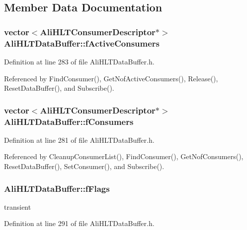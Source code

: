 \subsection{Member Data Documentation}
\subsubsection{\setlength{\rightskip}{0pt plus 5cm}vector$<${\bf Ali\-HLTConsumer\-Descriptor}$\ast$$>$ {\bf Ali\-HLTData\-Buffer::f\-Active\-Consumers}\hspace{0.3cm}{\tt  [private]}}\label{classAliHLTDataBuffer_r2}




Definition at line 283 of file Ali\-HLTData\-Buffer.h.

Referenced by Find\-Consumer(), Get\-Nof\-Active\-Consumers(), Release(), Reset\-Data\-Buffer(), and Subscribe().
\subsubsection{\setlength{\rightskip}{0pt plus 5cm}vector$<${\bf Ali\-HLTConsumer\-Descriptor}$\ast$$>$ {\bf Ali\-HLTData\-Buffer::f\-Consumers}\hspace{0.3cm}{\tt  [private]}}\label{classAliHLTDataBuffer_r1}




Definition at line 281 of file Ali\-HLTData\-Buffer.h.

Referenced by Cleanup\-Consumer\-List(), Find\-Consumer(), Get\-Nof\-Consumers(), Reset\-Data\-Buffer(), Set\-Consumer(), and Subscribe().
\subsubsection{ {\bf Ali\-HLTData\-Buffer::f\-Flags}\hspace{0.3cm}{\tt  [private]}}\label{classAliHLTDataBuffer_r5}


transient 



Definition at line 291 of file Ali\-HLTData\-Buffer.h.
